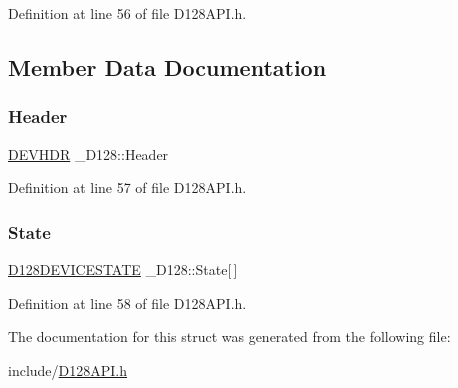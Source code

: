 Definition at line 56 of file D128\+A\+P\+I.\+h.



\subsection{Member Data Documentation}
\mbox{\label{struct___d128_a8348c7adb2ef3954c978112fe8b71785}} 
\subsubsection{\texorpdfstring{Header}{Header}}
{\footnotesize\ttfamily \hyperlink{_d128_a_p_i_8h_ac4f7ac6f5a50549a97c064894bdcf244}{D\+E\+V\+H\+DR} \+\_\+\+D128\+::\+Header}



Definition at line 57 of file D128\+A\+P\+I.\+h.

\mbox{\label{struct___d128_acad147b63666e9259067b464075e47d4}} 
\subsubsection{\texorpdfstring{State}{State}}
{\footnotesize\ttfamily \hyperlink{_d128_a_p_i_8h_aec4b5617f0e6a151d0388c3c6f61c199}{D128\+D\+E\+V\+I\+C\+E\+S\+T\+A\+TE} \+\_\+\+D128\+::\+State\mbox{[}$\,$\mbox{]}}



Definition at line 58 of file D128\+A\+P\+I.\+h.



The documentation for this struct was generated from the following file\+:\begin{DoxyCompactItemize}
\item 
include/\hyperlink{_d128_a_p_i_8h}{D128\+A\+P\+I.\+h}\end{DoxyCompactItemize}
